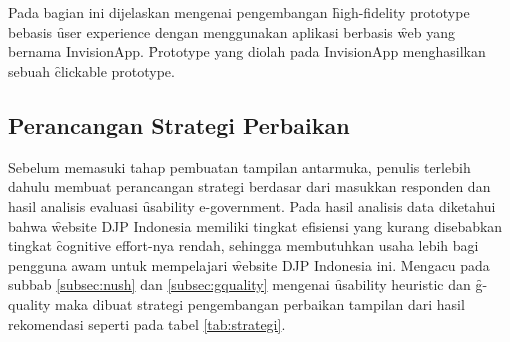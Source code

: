 \chapter{\babLima}
Pada bagian ini dijelaskan mengenai pengembangan \f{high-fidelity prototype} bebasis \f{user experience} dengan menggunakan aplikasi berbasis \f{web} yang bernama InvisionApp. \f{Prototype} yang diolah pada InvisionApp menghasilkan sebuah \f{clickable prototype}.
\section{Perancangan Strategi Perbaikan}
Sebelum memasuki tahap pembuatan tampilan antarmuka, penulis terlebih dahulu membuat perancangan strategi berdasar dari masukkan responden dan hasil analisis evaluasi \f{usability e-government}. Pada hasil analisis data diketahui bahwa \f{website} DJP Indonesia memiliki tingkat efisiensi yang kurang disebabkan tingkat \f{cognitive effort}-nya rendah, sehingga membutuhkan usaha lebih bagi pengguna awam untuk mempelajari \f{website} DJP Indonesia ini. Mengacu pada subbab \ref{subsec:nush} dan \ref{subsec:gquality} mengenai \f{usability heuristic} dan \f{g-quality} maka dibuat strategi pengembangan perbaikan tampilan dari hasil rekomendasi seperti pada tabel \ref{tab:strategi}.

